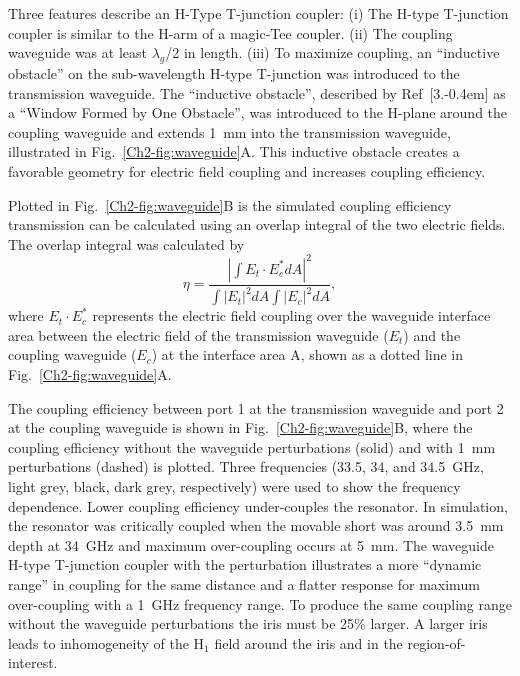Three features describe an H-Type T-junction coupler: (i) The H-type T-junction coupler is similar to the H-arm of a magic-Tee coupler. \cite{ramo1984fields, MITRadWaveguide} (ii) The coupling waveguide was at least $\lambda_g$/2 in length. (iii) To maximize coupling, an ``inductive obstacle'' on the sub-wavelength H-type T-junction was introduced to the transmission waveguide. The ``inductive obstacle'', described by Ref~[3.\kern-0.4em] as a ``Window Formed by One Obstacle'', was introduced to the H-plane around the coupling waveguide and extends 1~mm into the transmission waveguide, illustrated in Fig.~\ref{Ch2-fig:waveguide}A. This inductive obstacle creates a favorable geometry for electric field coupling and increases coupling efficiency. 

Plotted in Fig.~\ref{Ch2-fig:waveguide}B is the simulated coupling efficiency transmission can be calculated using an overlap integral \cite{born} of the two electric fields. The overlap integral was calculated by
\begin{equation}
    \eta = \frac{\left| \int E_{t} \cdot E^*_{c} dA\right|^2}{\int \left|E_t\right|^2 dA \int \left|E_c\right|^2 dA},
\end{equation}
where $E_{t} \cdot E^*_{c}$ represents the electric field coupling over the waveguide interface area between the electric field of the transmission waveguide ($E_{t}$) and the coupling waveguide ($E_{c}$) at the interface area A, shown as a dotted line in Fig.~\ref{Ch2-fig:waveguide}A. 

The coupling efficiency between port 1 at the transmission waveguide and port 2 at the coupling waveguide is shown in Fig.~\ref{Ch2-fig:waveguide}B, where the coupling efficiency without the waveguide perturbations (solid) and with 1~mm perturbations (dashed) is plotted. Three frequencies (33.5, 34, and 34.5~GHz, light grey, black, dark grey, respectively) were used to show the frequency dependence. Lower coupling efficiency under-couples the resonator. In simulation, the resonator was critically coupled when the movable short was around 3.5~mm depth at 34~GHz and maximum over-coupling occurs at 5~mm. The waveguide H-type T-junction coupler with the perturbation illustrates a more ``dynamic range'' in coupling for the same distance and a flatter response for maximum over-coupling with a 1~GHz frequency range. To produce the same coupling range without the waveguide perturbations the iris must be 25\% larger. A larger iris leads to inhomogeneity of the H$_1$ field around the iris and in the region-of-interest. 

